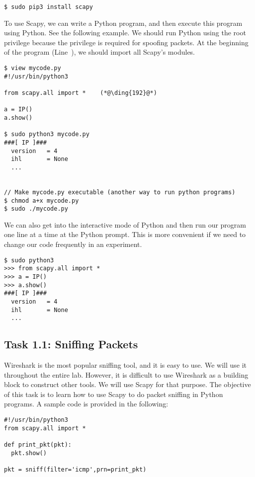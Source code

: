 \begin{lstlisting}
$ sudo pip3 install scapy
\end{lstlisting}


To use Scapy, we can write a Python program, and then execute this program
using Python. See the following example. We should run Python using the 
root privilege because the privilege is required for spoofing packets. 
At the beginning of the program (Line~), 
we should import all Scapy's modules.

\begin{lstlisting}
$ view mycode.py
#!/usr/bin/python3

from scapy.all import *    (*@\ding{192}@*)

a = IP()
a.show()

$ sudo python3 mycode.py
###[ IP ]###
  version   = 4
  ihl       = None
  ...


// Make mycode.py executable (another way to run python programs)
$ chmod a+x mycode.py
$ sudo ./mycode.py 
\end{lstlisting}


We can also get into the interactive mode of Python and
then run our program one line at a time at the Python prompt. 
This is more convenient if we need to change our code 
frequently in an experiment.

\begin{lstlisting}
$ sudo python3
>>> from scapy.all import *
>>> a = IP()
>>> a.show()
###[ IP ]###
  version   = 4
  ihl       = None
  ...
\end{lstlisting}
 

\subsection{Task 1.1: Sniffing Packets}  


Wireshark is the most popular sniffing tool, and it is easy to use. We will use it throughout 
the entire lab. However, it is difficult to use Wireshark as a building block 
to construct other tools. We will use Scapy for that purpose. The objective of this task is to
learn how to use Scapy to do packet sniffing in Python programs. 
A sample code is provided in the following:


\begin{lstlisting}
#!/usr/bin/python3
from scapy.all import *

def print_pkt(pkt):
  pkt.show()

pkt = sniff(filter='icmp',prn=print_pkt)
\end{lstlisting}

